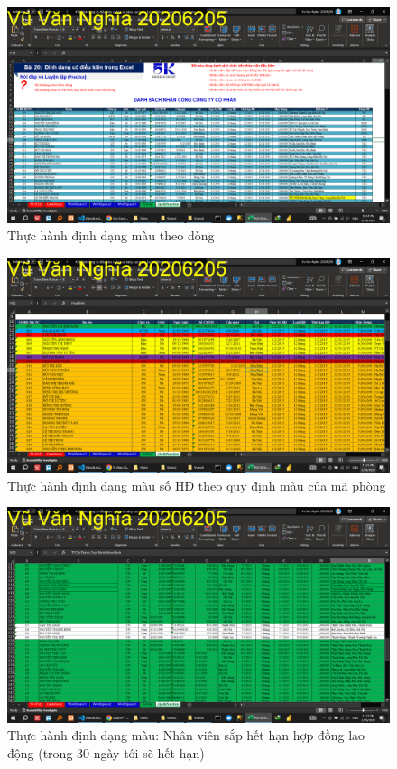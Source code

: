 \documentclass{article}
\begin{document}
\begin{figure}[h]
    \centering
    \includegraphics[scale = 0.15]{Video8/ThucHanh/0.png}
    \caption{Thực hành định dạng màu theo dòng}
\end{figure}
\begin{figure}[h]
    \centering
    \includegraphics[scale = 0.15]{Video8/ThucHanh/1.png}
    \caption{Thực hành định dạng màu số HĐ theo quy định màu của mã phòng}
\end{figure}
\begin{figure}[h]
    \centering
    \includegraphics[scale = 0.15]{Video8/ThucHanh/2.png}
    \caption{Thực hành định dạng màu: Nhân viên sắp hết hạn hợp đồng lao động (trong 30 ngày tới sẽ hết hạn)}
\end{figure}
\end{document}
